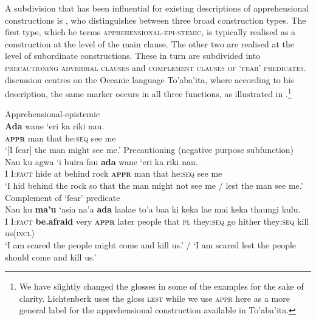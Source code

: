 \documentclass[output=paper,colorlinks,citecolor=brown
]{langscibook}
\begin{document}
A subdivision that has been influential for existing descriptions of apprehensional constructions is , who distinguishes between three broad construction types. The first type, which he terms \textsc{apprehensional}-\textsc{epi-stemic}, is typically realised as a construction at the level of the main clause. The other two are realised at the level of subordinate constructions. These in turn are subdivided into \textsc{precautioning adverbial clauses} and \textsc{complement clauses of `fear' predicates}.  discussion centres on the Oceanic language To'aba'ita, where according to his description, the same marker occurs in all three functions, as illustrated in .\footnote{We have slightly changed the glosses in some of the examples for the sake of clarity. Lichtenberk uses the gloss \textsc{lest} while we use \textsc{appr} here as a more general label for the apprehensional construction available in To'aba'ita.}
\newpage

\ea 
\label{ex:intro4} 
\ea \label{ex:intro4a} \textnormal{Apprehensional-epistemic} \\
\gll \textbf{Ada} wane `eri ka riki nau. \\
\textbf{\textsc{appr}} man that he:\textsc{seq} see me \\
\glt `[I fear] the man might see me.'  
\ex \label{ex:intro4b} \textnormal{Precautioning (negative purpose subfunction)} \\
\gll Nau ku	agwa `i	buira fau \textbf{ada} wane `eri ka riki nau.\\
I I:\textsc{fact} hide at behind rock \textbf{\textsc{appr}} man that he:\textsc{seq} see me\\ 
\glt `I hid behind the rock so that the man might not see me / lest the man see me.' 
  \newpage  \ex \label{ex:intro4c} \textnormal{Complement of `fear' predicate} \\
\gll Nau ku \textbf{ma'u} {`asia na'a} \textbf{ada} laalae to'a baa ki keka lae	mai keka thaungi kulu.\\
I I:\textsc{fact} \textbf{be.afraid} very \textbf{\textsc{appr}} later people that \textsc{pl} they:\textsc{seq} go hither they:\textsc{seq} kill us(\textsc{incl}) \\
\glt `I am scared the people might come and kill us.' / `I am scared lest the people should come and kill us.'  \\
\z
\z
\end{document}
